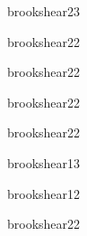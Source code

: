 \begin{syllabus}
\begin{unit}{\ARInterfacingAndIOStrategiesDef}{brookshear}{2}{3}
    \ARInterfacingAndIOStrategiesAllTopics
    \ARInterfacingAndIOStrategiesAllObjectives
\end{unit}

\begin{unit}{\OSOverviewofOperatingSystemsDef}{brookshear}{2}{2}
    \OSOverviewofOperatingSystemsAllTopics
    \OSOverviewofOperatingSystemsAllObjectives
\end{unit}

\begin{unit}{\NCIntroductionDef}{brookshear}{2}{2}
   \NCIntroductionAllTopics
   \NCIntroductionAllObjectives
\end{unit}

\begin{unit}{\PLOverviewDef}{brookshear}{2}{2}
    \PLOverviewAllTopics
    \PLOverviewAllObjectives
\end{unit}

\begin{unit}{\PLVirtualMachinesDef}{brookshear}{2}{2}
    \PLVirtualMachinesAllTopics
    \PLVirtualMachinesAllObjectives
\end{unit}

\begin{unit}{\PLObjectOrientedProgrammingDef}{brookshear}{1}{3}
    \PLObjectOrientedProgrammingAllTopics
    \PLObjectOrientedProgrammingAllObjectives
\end{unit}

\begin{unit}{\PLLanguageTranslatioSystemsDef}{brookshear}{1}{2}
    \PLLanguageTranslatioSystemsAllTopics
    \PLLanguageTranslatioSystemsAllObjectives
\end{unit}

\begin{unit}{\HCFoundationsDef}{brookshear}{2}{2}
   \begin{topics}
      \item \HCFoundationsTopicMotivation
      \item \HCFoundationsTopicContext
   \end{topics}

   \begin{learningoutcomes}
      \item \HCFoundationsObjONE
      \item \HCFoundationsObjTWO
   \end{learningoutcomes}
\end{unit}


\end{syllabus}
